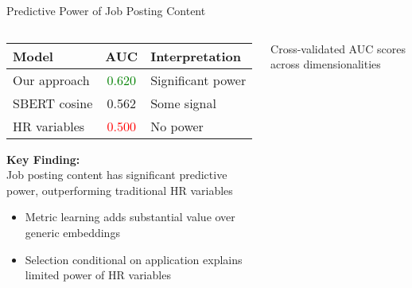 \documentclass{beamer}
\begin{document}
\begin{frame}{Predictive Power of Job Posting Content}
\begin{columns}
\begin{column}{0.48\textwidth}
\begin{table}
\centering
\begin{tabular}{l c l}
\toprule
\textbf{Model} & \textbf{AUC} & \textbf{Interpretation} \\
\midrule
Our approach & \textcolor{green}{0.620} & Significant power \\
SBERT cosine & 0.562 & Some signal \\
HR variables & \textcolor{red}{0.500} & No power \\
\bottomrule
\end{tabular}
\end{table}

\begin{tcolorbox}[colback=boxbackground,colframe=boxframe,sharp corners]
\textbf{Key Finding:}\\
Job posting content has significant predictive power, outperforming traditional HR variables
\end{tcolorbox}

\begin{itemize}
    \item Metric learning adds substantial value over generic embeddings
    \item Selection conditional on application explains limited power of HR variables
\end{itemize}
\end{column}
\begin{column}{0.48\textwidth}
\caption*{Cross-validated AUC scores across dimensionalities}
\end{column}
\end{columns}
\end{frame}
\end{document}
